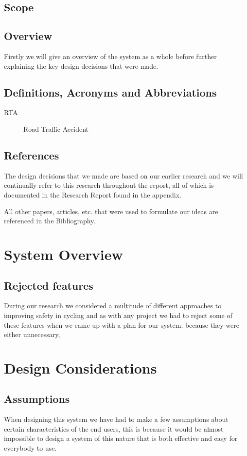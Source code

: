 \documentclass[]{report}
\begin{document}
\section{Scope}

\section{Overview}
Firstly we will give an overview of the system as a whole before further explaining the key design decisions that were made. 
\section{Definitions, Acronyms and Abbreviations}
\begin{description}
\item[RTA] Road Traffic Accident
\end{description}
\section{References}
The design decisions that we made are based on our earlier research and we will continually refer to this research throughout the report, all of which is documented in the Research Report found in the appendix. 

All other papers, articles, etc. that were used to formulate our ideas are referenced in the Bibliography.

\chapter{System Overview}
% 

\section{Rejected features}
During our research we considered a multitude of different approaches to improving safety in cycling and as with any project we had to reject some of these features when we came up with a plan for our system. because they were either unnecessary, 

\chapter{Design Considerations}
\section{Assumptions}
When designing this system we have had to make a few assumptions about certain characteristics of the end users, this is because it would be almost impossible to design a system of this nature that is both effective and easy for everybody to use. 
\end{document}
